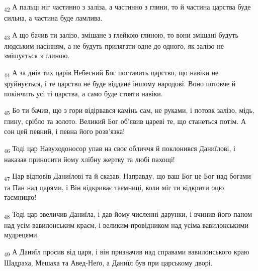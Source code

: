 \begin{tcolorbox}
\textsubscript{42} А пальці ніг частинно з заліза, а частинно з глини, то й частина царства буде сильна, а частина буде ламлива.
\end{tcolorbox}
\begin{tcolorbox}
\textsubscript{43} А що бачив ти залізо, змішане з глейкою глиною, то вони змішані будуть людським насінням, а не будуть прилягати одне до одного, як залізо не змішується з глиною.
\end{tcolorbox}
\begin{tcolorbox}
\textsubscript{44} А за днів тих царів Небесний Бог поставить царство, що навіки не зруйнується, і те царство не буде віддане іншому народові. Воно потовче й покінчить усі ті царства, а само буде стояти навіки.
\end{tcolorbox}
\begin{tcolorbox}
\textsubscript{45} Бо ти бачив, що з гори відірвався камінь сам, не руками, і потовк залізо, мідь, глину, срібло та золото. Великий Бог об'явив цареві те, що станеться потім. А сон цей певний, і певна його розв'язка!
\end{tcolorbox}
\begin{tcolorbox}
\textsubscript{46} Тоді цар Навуходоносор упав на своє обличчя й поклонився Даниїлові, і наказав приносити йому хлібну жертву та любі пахощі!
\end{tcolorbox}
\begin{tcolorbox}
\textsubscript{47} Цар відповів Даниїлові та й сказав: Направду, що ваш Бог це Бог над богами та Пан над царями, і Він відкриває таємниці, коли міг ти відкрити оцю таємницю!
\end{tcolorbox}
\begin{tcolorbox}
\textsubscript{48} Тоді цар звеличив Даниїла, і дав йому численні дарунки, і вчинив його паном над усім вавилонським краєм, і великим провідником над усіма вавилонськими мудрецями.
\end{tcolorbox}
\begin{tcolorbox}
\textsubscript{49} А Даниїл просив від царя, і він призначив над справами вавилонського краю Шадраха, Мешаха та Авед-Неґо, а Даниїл був при царському дворі.
\end{tcolorbox}
